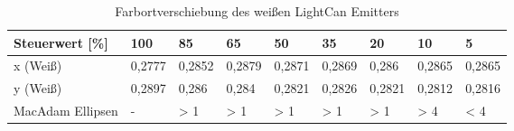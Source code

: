 \documentclass[11pt]{scrartcl}
\begin{document}
\noindent
\begin{table}[H]
    \begin{tabularx}{\textwidth}{|l|X|X|X|X|X|X|X|X|}
        \hline
        Steuerwert [\%]  & 100    & 85     & 65     & 50     & 35     & 20     & 10     & 5      \\\hline
        x (Weiß)         & 0,2777 & 0,2852 & 0,2879 & 0,2871 & 0,2869 & 0,286  & 0,2865 & 0,2865 \\\hline
        y (Weiß)         & 0,2897 & 0,286  & 0,284  & 0,2821 & 0,2826 & 0,2821 & 0,2812 & 0,2816 \\\hline
        MacAdam Ellipsen & -      & > 1    & > 1    & > 1    & > 1    & > 1    & > 4    & < 4    \\\hline
    \end{tabularx}
    \caption{Farbortverschiebung des weißen LightCan Emitters} \label{table:whiteEmitterLightCan}
\end{table}
\noindent
\clearpage
\end{document}
